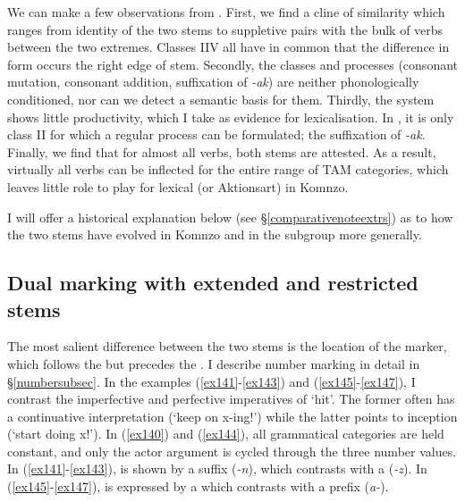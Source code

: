 We can make a few observations from . First, we find a cline of similarity which ranges from identity of the two stems to suppletive pairs with the bulk of verbs between the two extremes. Classes II\textendash{}V all have in common that the difference in form occurs the right edge of stem. Secondly, the classes and processes (consonant mutation, consonant addition, suffixation of \emph{-ak}) are neither phonologically conditioned, nor can we detect a semantic basis for them. Thirdly, the system shows little productivity, which I take as evidence for lexicalisation. In , it is only class II for which a regular process can be formulated; the suffixation of \emph{-ak}. Finally, we find that for almost all verbs, both stems are attested. As a result, virtually all verbs can be inflected for the entire range of TAM categories, which leaves little role to play for lexical  (or Aktionsart) in Komnzo.%

I will offer a historical explanation below (see \S{}\ref{comparativenoteextrs}) as to how the two stems have evolved in Komnzo and in the  subgroup more generally.

\subsection{Dual marking with extended and restricted stems} \label{dualextrs}

The most salient difference between the two stems is the location of the  marker, which follows the  but precedes the . I describe number marking in detail in \S{}\ref{numbersubsec}. In the examples (\ref{ex141}-\ref{ex143}) and (\ref{ex145}-\ref{ex147}), I contrast the imperfective and perfective imperatives of `hit'. The former often has a continuative interpretation (`keep on x-ing!') while the latter points to inception (`start doing x!'). In (\ref{ex140}) and (\ref{ex144}), all grammatical categories are held constant, and only the actor argument is cycled through the three number values. In (\ref{ex141}-\ref{ex143}),  is shown by a suffix (\emph{-n}), which contrasts with a  (\emph{-z}). In (\ref{ex145}-\ref{ex147}),  is expressed by a  which contrasts with a  prefix (\emph{a-}).

